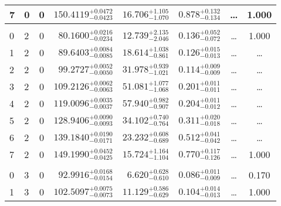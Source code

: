 \begin{table*}[!]
\begin{tabular}{llcrrlrc}
7 & 0 & 0 & $    150.4119_{-      0.0423}^{+      0.0472}$ & $      16.706_{-       1.070}^{+       1.105}$ & $       0.878_{-       0.134}^{+       0.132}$ & \multicolumn{1}{c}{\dots} & 1.000\\[1pt]
\hline \\[-8pt]
0 & 2 & 0 & $     80.1600_{-      0.0234}^{+      0.0216}$ & $      12.739_{-       2.046}^{+       2.135}$ & $       0.136_{-       0.072}^{+       0.052}$ & \multicolumn{1}{c}{\dots} & 1.000\\[1pt]
1 & 2 & 0 & $     89.6403_{-      0.0085}^{+      0.0084}$ & $      18.614_{-       0.861}^{+       1.038}$ & $       0.126_{-       0.013}^{+       0.015}$ & \multicolumn{1}{c}{\dots} & \dots \\[1pt]
2 & 2 & 0 & $     99.2727_{-      0.0050}^{+      0.0052}$ & $      31.978_{-       1.021}^{+       0.939}$ & $       0.114_{-       0.009}^{+       0.009}$ & \multicolumn{1}{c}{\dots} & \dots \\[1pt]
3 & 2 & 0 & $    109.2126_{-      0.0063}^{+      0.0062}$ & $      51.081_{-       1.068}^{+       1.077}$ & $       0.201_{-       0.011}^{+       0.011}$ & \multicolumn{1}{c}{\dots} & \dots \\[1pt]
4 & 2 & 0 & $    119.0096_{-      0.0037}^{+      0.0035}$ & $      57.940_{-       0.907}^{+       0.982}$ & $       0.204_{-       0.012}^{+       0.011}$ & \multicolumn{1}{c}{\dots} & \dots \\[1pt]
5 & 2 & 0 & $    128.9406_{-      0.0093}^{+      0.0090}$ & $      34.102_{-       0.764}^{+       0.740}$ & $       0.311_{-       0.018}^{+       0.020}$ & \multicolumn{1}{c}{\dots} & \dots \\[1pt]
6 & 2 & 0 & $    139.1840_{-      0.0171}^{+      0.0190}$ & $      23.232_{-       0.689}^{+       0.608}$ & $       0.512_{-       0.042}^{+       0.041}$ & \multicolumn{1}{c}{\dots} & \dots \\[1pt]
7 & 2 & 0 & $    149.1990_{-      0.0425}^{+      0.0452}$ & $      15.724_{-       1.104}^{+       1.164}$ & $       0.770_{-       0.126}^{+       0.117}$ & \multicolumn{1}{c}{\dots} & 1.000\\[1pt]
\hline \\[-8pt]
0 & 3 & 0 & $     92.9916_{-      0.0154}^{+      0.0168}$ & $       6.620_{-       0.610}^{+       0.628}$ & $       0.086_{-       0.009}^{+       0.011}$ & \multicolumn{1}{c}{\dots} & 0.170\\[1pt]
1 & 3 & 0 & $    102.5097_{-      0.0073}^{+      0.0075}$ & $      11.129_{-       0.629}^{+       0.586}$ & $       0.104_{-       0.013}^{+       0.014}$ & \multicolumn{1}{c}{\dots} & 1.000\\[1pt]

\end{tabular}
\end{table*}
